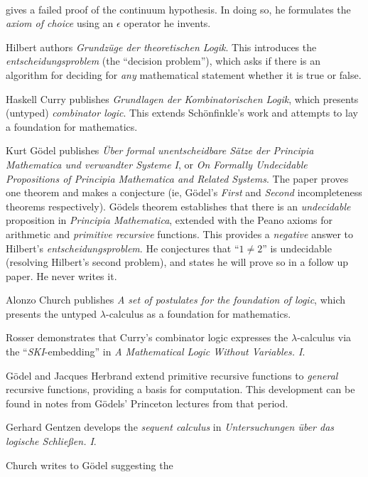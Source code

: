 \documentclass{beamer}
\begin{document}
\begin{frame}[allowframebreaks]{\insertsectionhead\ \textemdash\
    \insertsubsectionhead}
\begin{description}
    gives a failed proof of the continuum hypothesis.  In doing so, he
    formulates the \emph{axiom of choice} using an \(\epsilon\)
    operator he invents.
  \item[1928] Hilbert authors \emph{Grundz\"uge der theoretischen
      Logik}. This introduces the \emph{entscheidungsproblem} (the
    ``decision problem''), which asks if there is an algorithm for
    deciding for \emph{any} mathematical statement whether it is true
    or false.
  \item[1930] Haskell Curry publishes \emph{Grundlagen der
      Kombinatorischen Logik}, which presents (untyped)
    \emph{combinator logic}. This extends Sch\"onfinkle's work and
    attempts to lay a foundation for mathematics.
  \item[1931] Kurt G\"odel publishes \emph{\"Uber formal
      unentscheidbare S\"atze der Principia Mathematica und verwandter
      Systeme I}, or \emph{On Formally Undecidable Propositions of
      Principia Mathematica and Related Systems}.  The paper proves
    one theorem and makes a conjecture (ie, G\"odel's \emph{First} and
    \emph{Second} incompleteness theorems respectively).  G\"odels
    theorem establishes that there is an \emph{undecidable}
    proposition in \emph{Principia Mathematica}, extended with the
    Peano axioms for arithmetic and \emph{primitive recursive}
    functions.  This provides a \emph{negative} answer to Hilbert's
    \emph{entscheidungsproblem}.  He conjectures that ``$1 \neq 2$''
    is undecidable (resolving Hilbert's second problem), and states he
    will prove so in a follow up paper.  He never writes it.
  \item[1932] Alonzo Church publishes \emph{A set of postulates for
      the foundation of logic}, which presents the untyped
    $\lambda$-calculus as a foundation for mathematics.
  \item[1933] Rosser demonstrates that Curry's combinator logic
    expresses the $\lambda$-calculus via the ``\emph{SKI}-embedding''
    in \emph{A Mathematical Logic Without Variables. I}.
  \item[1934] G\"odel and Jacques Herbrand extend primitive recursive
    functions to \emph{general} recursive functions, providing a basis
    for computation. This development can be found in notes from
    G\"odels' Princeton lectures from that period.
  \item[1934] Gerhard Gentzen develops the \emph{sequent calculus} in
    \emph{Untersuchungen über das logische Schließen. I}.
  \item[1935] Church writes to G\"odel suggesting the

\end{description}
\end{frame}
\end{document}
